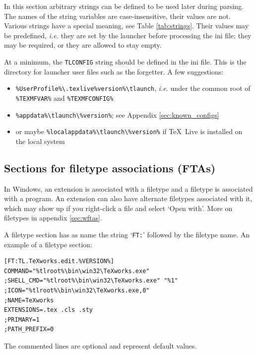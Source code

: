 \documentclass[11pt,a4paper,oneside]{report}
\def\TL{\TeX~Live}
\let\bsl\textbackslash
\def\bslb{\bsl\discretionary{}{}{}}
\begin{document}
In this section arbitrary strings can be defined to be used later
during parsing. The names of the string variables are
case-insensitive, their values are not. Various strings have a
special meaning, see Table \ref{tab:strings}. Their values may be
predefined, \emph{i.e.} they are set by the launcher before
processing the ini file; they may be required, or they are allowed
to stay empty.

At a minimum, the \texttt{TLCONFIG} string should be defined in the
ini file. This is the directory for launcher user files such as the
forgetter. A few suggestions:
  \begin{itemize}
  \item \texttt{\%UserProfile\%\bsl.texlive\%version\%\bslb tlaunch},
    \emph{i.e.} under the common root of \texttt{\%TEXMFVAR\%} and
    \texttt{\%TEXMFCONFIG\%}
  \item \texttt{\%appdata\%\bslb tlaunch\bslb\%version\%}; see Appendix
      \ref{sec:known_configs}
  \item or maybe \texttt{\%localappdata\%\bslb tlaunch\bslb\%version\%} if
    \TL{} is installed on the local system
  \end{itemize}

\subsection{Sections for filetype associations (FTAs)}
\label{sec:fta}

In Windows, an extension is associated with a filetype and a
filetype is associated with a program. An extension can also have
alternate filetypes associated with it, which may show up if you
right-click a file and select `Open with\textellipsis'. More on
filetypes in appendix \ref{sec:wftas}.

A filetype section has as name the string `\texttt{FT:}' followed by
the filetype name. An example of a filetype section:

\begin{verbatim}
[FT:TL.TeXworks.edit.%VERSION%]
COMMAND="%tlroot%\bin\win32\TeXworks.exe"
;SHELL_CMD="%tlroot%\bin\win32\TeXworks.exe" "%1"
;ICON="%tlroot%\bin\win32\TeXworks.exe,0"
;NAME=TeXworks
EXTENSIONS=.tex .cls .sty
;PRIMARY=1
;PATH_PREFIX=0
\end{verbatim}

The commented lines are optional and represent default values.
\end{document}
